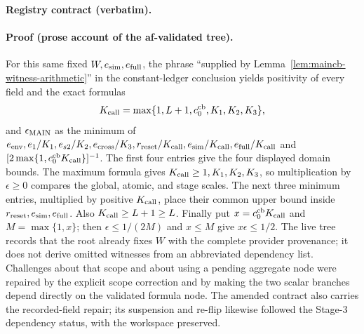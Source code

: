 \noindent\textbf{Registry contract (verbatim).}

\paragraph{Proof (prose account of the af-validated tree).}
For this same fixed $W,e_{\rm sim},e_{\rm full}$, the phrase ``supplied by
Lemma~\ref{lem:maincb-witness-arithmetic}'' in the constant-ledger conclusion yields
positivity of every field and the exact formulas
\[
 K_{\rm call}=\max\{1,L+1,c_0^{\rm cb},K_1,K_2,K_3\},
\]
and $\epsilon_{\rm MAIN}$ as the minimum of
$e_{\rm env},e_1/K_1,e_{s2}/K_2,e_{\rm cross}/K_3,r_{\rm reset}/K_{\rm call},
e_{\rm sim}/K_{\rm call},e_{\rm full}/K_{\rm call}$ and
$[2\max\{1,c_0^{\rm cb}K_{\rm call}\}]^{-1}$.  The first four entries give the four
displayed domain bounds.  The maximum formula gives
$K_{\rm call}\ge1,K_1,K_2,K_3$, so multiplication by $\epsilon\ge0$ compares the global,
atomic, and stage scales.  The next three minimum entries, multiplied by positive
$K_{\rm call}$, place their common upper bound inside
$r_{\rm reset},e_{\rm sim},e_{\rm full}$.  Also $K_{\rm call}\ge L+1\ge L$.
Finally put $x=c_0^{\rm cb}K_{\rm call}$ and $M=\max\{1,x\}$; then
$\epsilon\le1/(2M)$ and $x\le M$ give $x\epsilon\le1/2$.
The live tree records that the root already fixes $W$ with the complete provider provenance;
it does not derive omitted witnesses from an abbreviated dependency list.  Challenges about
that scope and about using a pending aggregate node were repaired by the explicit scope
correction and by making the two scalar branches depend directly on the validated formula node.
The amended contract also carries the recorded-field repair; its suspension and re-flip likewise followed the Stage-3 dependency status, with the workspace preserved.


